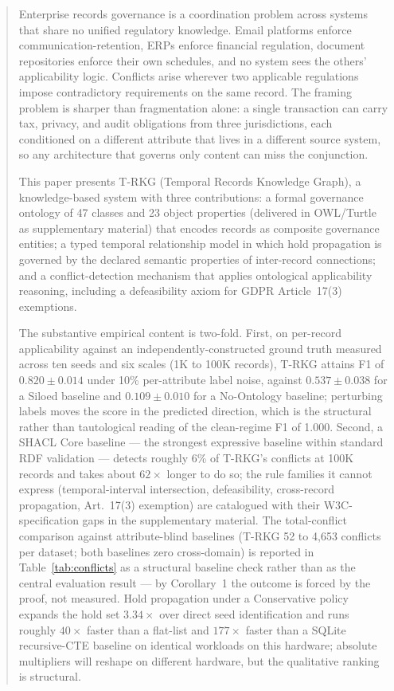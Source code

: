 \documentclass{ieeeaccess}
\begin{document}
\begin{abstract}
Enterprise records governance is a coordination problem across systems that share no unified regulatory knowledge. Email platforms enforce communication-retention, ERPs enforce financial regulation, document repositories enforce their own schedules, and no system sees the others' applicability logic. Conflicts arise wherever two applicable regulations impose contradictory requirements on the same record. The framing problem is sharper than fragmentation alone: a single transaction can carry tax, privacy, and audit obligations from three jurisdictions, each conditioned on a different attribute that lives in a different source system, so any architecture that governs only content can miss the conjunction.

This paper presents T-RKG (Temporal Records Knowledge Graph), a knowledge-based system with three contributions: a formal governance ontology of 47 classes and 23 object properties (delivered in OWL/Turtle as supplementary material) that encodes records as composite governance entities; a typed temporal relationship model in which hold propagation is governed by the declared semantic properties of inter-record connections; and a conflict-detection mechanism that applies ontological applicability reasoning, including a defeasibility axiom for GDPR Article~17(3) exemptions.

The substantive empirical content is two-fold. First, on per-record applicability against an independently-constructed ground truth measured across ten seeds and six scales (1K to 100K records), T-RKG attains F1 of $0.820 \pm 0.014$ under 10\% per-attribute label noise, against $0.537 \pm 0.038$ for a Siloed baseline and $0.109 \pm 0.010$ for a No-Ontology baseline; perturbing labels moves the score in the predicted direction, which is the structural rather than tautological reading of the clean-regime F1 of 1.000. Second, a SHACL Core baseline --- the strongest expressive baseline within standard RDF validation --- detects roughly 6\% of T-RKG's conflicts at 100K records and takes about $62\times$ longer to do so; the rule families it cannot express (temporal-interval intersection, defeasibility, cross-record propagation, Art.~17(3) exemption) are catalogued with their W3C-specification gaps in the supplementary material. The total-conflict comparison against attribute-blind baselines (T-RKG 52 to 4{,}653 conflicts per dataset; both baselines zero cross-domain) is reported in Table~\ref{tab:conflicts} as a structural baseline check rather than as the central evaluation result --- by Corollary~1 the outcome is forced by the proof, not measured. Hold propagation under a Conservative policy expands the hold set $3.34\times$ over direct seed identification and runs roughly $40\times$ faster than a flat-list and $177\times$ faster than a SQLite recursive-CTE baseline on identical workloads on this hardware; absolute multipliers will reshape on different hardware, but the qualitative ranking is structural.
\end{abstract}
\end{document}
